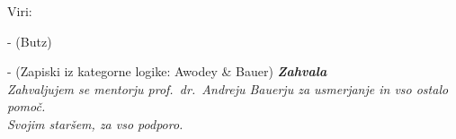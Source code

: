 \documentclass[../kategoricna_logika.tex]{subfiles}
\begin{document}
Viri:

- (Butz)

- (Zapiski iz kategorne logike: Awodey \& Bauer)
\vspace{15mm}
%
\vspace{2cm}
%
\clearemptydoublepage
%
\thispagestyle{empty}\mbox{}\vfill\null\it%
\vfill
{\Large \bf Zahvala}
\vspace{1cm}\\
Zahvaljujem se mentorju prof.\ dr.\ Andreju Bauerju za usmerjanje in vso ostalo pomoč. \\
Svojim staršem, za vso podporo. \\
\rm\normalfont
%
\clearemptydoublepage
%


\pagestyle{empty}
\def\thepage{}%
\tableofcontents{}
%
\clearemptydoublepage
%
%
\end{document}
